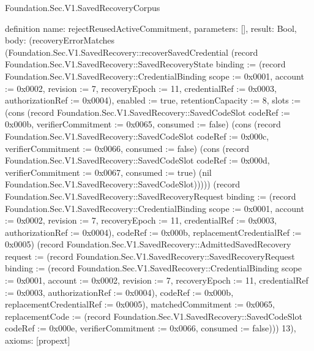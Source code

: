 \begin{lexlean}{Foundation.Sec.V1.SavedRecoveryCorpus}
\begin{semanticmodule}
definition{
  name: rejectReusedActiveCommitment,
  parameters: [],
  result: Bool,
  body: (recoveryErrorMatches (Foundation.Sec.V1.SavedRecovery::recoverSavedCredential (record Foundation.Sec.V1.SavedRecovery::SavedRecoveryState {binding := (record Foundation.Sec.V1.SavedRecovery::CredentialBinding {scope := 0x0001, account := 0x0002, revision := 7, recoveryEpoch := 11, credentialRef := 0x0003, authorizationRef := 0x0004}), enabled := true, retentionCapacity := 8, slots := (cons (record Foundation.Sec.V1.SavedRecovery::SavedCodeSlot {codeRef := 0x000b, verifierCommitment := 0x0065, consumed := false}) (cons (record Foundation.Sec.V1.SavedRecovery::SavedCodeSlot {codeRef := 0x000c, verifierCommitment := 0x0066, consumed := false}) (cons (record Foundation.Sec.V1.SavedRecovery::SavedCodeSlot {codeRef := 0x000d, verifierCommitment := 0x0067, consumed := true}) (nil Foundation.Sec.V1.SavedRecovery::SavedCodeSlot))))}) (record Foundation.Sec.V1.SavedRecovery::SavedRecoveryRequest {binding := (record Foundation.Sec.V1.SavedRecovery::CredentialBinding {scope := 0x0001, account := 0x0002, revision := 7, recoveryEpoch := 11, credentialRef := 0x0003, authorizationRef := 0x0004}), codeRef := 0x000b, replacementCredentialRef := 0x0005}) (record Foundation.Sec.V1.SavedRecovery::AdmittedSavedRecovery {request := (record Foundation.Sec.V1.SavedRecovery::SavedRecoveryRequest {binding := (record Foundation.Sec.V1.SavedRecovery::CredentialBinding {scope := 0x0001, account := 0x0002, revision := 7, recoveryEpoch := 11, credentialRef := 0x0003, authorizationRef := 0x0004}), codeRef := 0x000b, replacementCredentialRef := 0x0005}), matchedCommitment := 0x0065, replacementCode := (record Foundation.Sec.V1.SavedRecovery::SavedCodeSlot {codeRef := 0x000e, verifierCommitment := 0x0066, consumed := false})})) 13),
  axioms: [propext]
}


\end{semanticmodule}
\end{lexlean}
